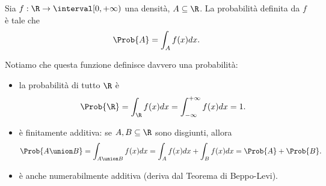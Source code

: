 \begin{definition}
    Sia $f : \R \to \interval[{0, +\infty})$ una densità, $A \subseteq \R$. La probabilità definita da $f$ è tale che \[
        \Prob{A} = \int_{A} f(x)dx.    
    \]
\end{definition}

Notiamo che questa funzione definisce davvero una probabilità:
\begin{itemize}
    \item la probabilità di tutto $\R$ è \[
        \Prob{\R} = \int_{\R} f(x)dx = \int_{-\infty}^{+\infty} f(x)dx = 1.    
    \]
    \item è finitamente additiva: se $A, B \subseteq \R$ sono disgiunti, allora \[
        \Prob{A \union B} = \int_{A \union B} f(x)dx = \int_A f(x)dx + \int_B f(x)dx = \Prob{A} + \Prob{B}.    
    \]
    \item è anche numerabilmente additiva (deriva dal Teorema di Beppo-Levi).
\end{itemize}

